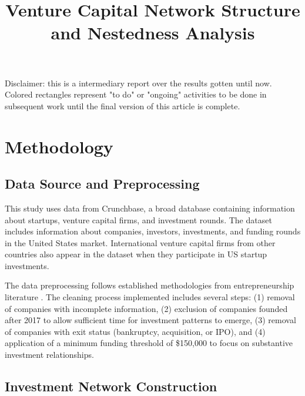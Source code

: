\documentclass[12pt]{article}
\title{Venture Capital Network Structure and Nestedness Analysis}
\author{}
\date{}
\begin{document}
\maketitle

Disclaimer: this is a intermediary report over the results gotten until now. Colored rectangles represent "to do" or "ongoing" activities to be done in subsequent work until the final version of this article is complete.

\section{Methodology}

\subsection{Data Source and Preprocessing}

This study uses data from Crunchbase, a broad database containing information about startups, venture capital firms, and investment rounds. The dataset includes information about companies, investors, investments, and funding rounds in the United States market. International venture capital firms from other countries also appear in the dataset when they participate in US startup investments.

The data preprocessing follows established methodologies from entrepreneurship literature \cite{Dalle2025}. The cleaning process implemented includes several steps: (1) removal of companies with incomplete information, (2) exclusion of companies founded after 2017 to allow sufficient time for investment patterns to emerge, (3) removal of companies with exit status (bankruptcy, acquisition, or IPO), and (4) application of a minimum funding threshold of \$150,000 to focus on substantive investment relationships.



\subsection{Investment Network Construction}
\end{document}
